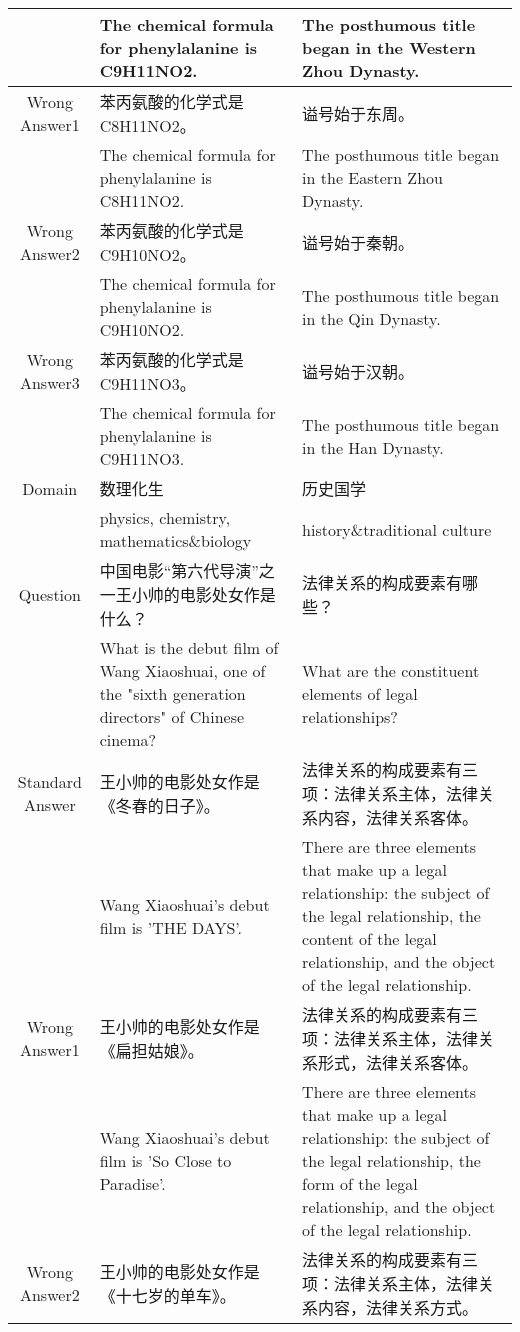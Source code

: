 \begin{CJK*}{UTF8}{gbsn}
\begin{table*}[ht]
{\begin{tabular}{c|p{10cm}|p{10cm}}
    & The chemical formula for phenylalanine is C9H11NO2. & The posthumous title began in the Western Zhou Dynasty.  \\
    \midrule
    Wrong Answer1 & 苯丙氨酸的化学式是C8H11NO2。 & 谥号始于东周。\\
    & The chemical formula for phenylalanine is C8H11NO2. & The posthumous title began in the Eastern Zhou Dynasty. \\
    \midrule
    Wrong Answer2 & 苯丙氨酸的化学式是C9H10NO2。& 谥号始于秦朝。 \\
    & The chemical formula for phenylalanine is C9H10NO2. & The posthumous title began in the Qin Dynasty. \\
    \midrule
    Wrong Answer3 & 苯丙氨酸的化学式是C9H11NO3。 & 谥号始于汉朝。\\
    & The chemical formula for phenylalanine is C9H11NO3. & The posthumous title began in the Han Dynasty. \\ 
    \midrule
    Domain & 数理化生 & 历史国学 \\
    &physics, chemistry, mathematics\&biology & history\&traditional culture \\
    \midrule[1.5pt]
    \rowcolor{blue!10} Question & 中国电影“第六代导演”之一王小帅的电影处女作是什么？ & 法律关系的构成要素有哪些？ \\
    \rowcolor{blue!10} & What is the debut film of Wang Xiaoshuai, one of the "sixth generation directors" of Chinese cinema? & What are the constituent elements of legal relationships?  \\ 
    \midrule
    Standard Answer & 王小帅的电影处女作是《冬春的日子》。 & 法律关系的构成要素有三项：法律关系主体，法律关系内容，法律关系客体。 \\
    & Wang Xiaoshuai's debut film is 'THE DAYS'. & There are three elements that make up a legal relationship: the subject of the legal relationship, the content of the legal relationship, and the object of the legal relationship.  \\
    \midrule
    Wrong Answer1 & 王小帅的电影处女作是《扁担姑娘》。 & 法律关系的构成要素有三项：法律关系主体，法律关系形式，法律关系客体。\\
    & Wang Xiaoshuai's debut film is 'So Close to Paradise'. & There are three elements that make up a legal relationship: the subject of the legal relationship, the form of the legal relationship, and the object of the legal relationship. \\
    \midrule
    Wrong Answer2 & 王小帅的电影处女作是《十七岁的单车》。& 法律关系的构成要素有三项：法律关系主体，法律关系内容，法律关系方式。 \\

\end{tabular}}
\end{table*}
\end{CJK*}
